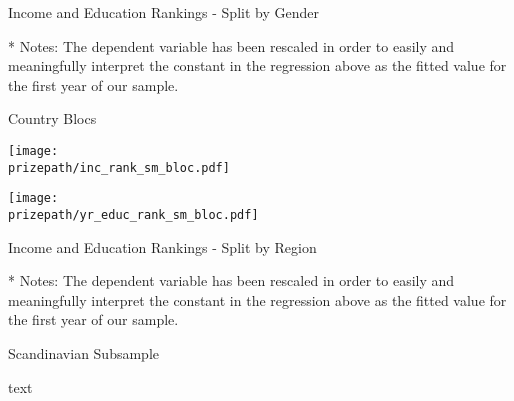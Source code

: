 \begin{frame}{Income and Education Rankings - Split by Gender}

\begin{table}[hp]
\begin{center}
  \caption{Rankings over time}
\scalebox{0.9}{}
\end{center}
\begin{tablenotes}\footnotesize
\item[*] Notes: The dependent variable has been rescaled in order to easily and meaningfully interpret the constant in the regression above as the fitted value for the first year of our sample.
\end{tablenotes}
\end{table}

\end{frame}


\begin{frame}{Country Blocs}

  \texttt{[image: \\prizepath/inc\_rank\_sm\_bloc.pdf]}

\end{frame}

\begin{frame}{ }

  \texttt{[image: \\prizepath/yr\_educ\_rank\_sm\_bloc.pdf]}

\end{frame}

\begin{frame}{Income and Education Rankings - Split by Region}

\begin{table}[hp]
\begin{center}
  \caption{Rankings over time}
\scalebox{0.9}{}
\end{center}
\begin{tablenotes}\footnotesize
\item[*] Notes: The dependent variable has been rescaled in order to easily and meaningfully interpret the constant in the regression above as the fitted value for the first year of our sample.
\end{tablenotes}
\end{table}

\end{frame}


\begin{frame}{Scandinavian Subsample}

  text
  
\end{frame}



